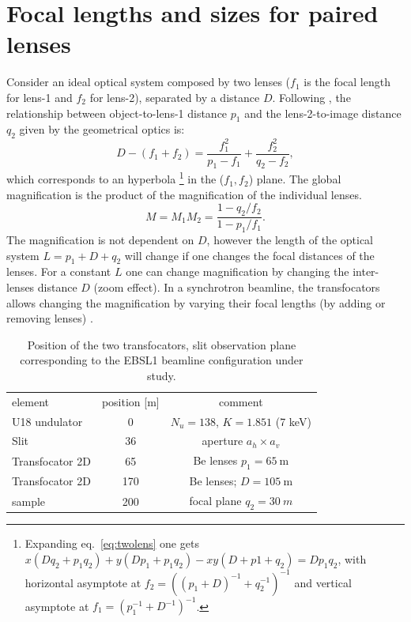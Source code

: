 \documentclass[9pt,twocolumn,twoside]{osajnl}
\begin{document}
\section{Focal lengths and sizes for paired lenses}

Consider an ideal optical system composed by two lenses ($f_1$ is the focal length for lens-1 and $f_2$ for lens-2), separated by a distance $D$. Following \cite{Goodman85}, the relationship between object-to-lens-1 distance $p_1$ and the lens-2-to-image distance $q_2$ given by the geometrical optics is:
\begin{equation}
\label{eq:twolens}
    D-(f_1+f_2)=\frac{f_1^2}{p_1-f_1} + \frac{f_2^2}{q_2-f_2},
\end{equation}
which corresponds to an hyperbola
\footnote{Expanding eq.~\ref{eq:twolens} one gets $x(D q_2 + p_1 q_2) + y (D p_1 + p_1 q_2) - x y (D + p1 + q_2) = D p_1 q_2$,  with horizontal asymptote at $f_{2}=((p_1+D)^{-1}+q_2^{-1})^{-1}$ and vertical asymptote at $f_{1}=(p_1^{-1}+D^{-1})^{-1}$.} in the ($f_1,f_2$) plane.
The global magnification is the product of the magnification of the individual lenses.
\begin{equation}
\label{eq:magnification}
    M=M_1 M_2=\frac{1-q_2/f_2}{1-p_1/f_1}.
\end{equation}
The magnification is not dependent on $D$, however the length of the optical system $L=p_1+D+q_2$ will change if one changes the focal distances of the lenses. For a constant $L$ one can change magnification by changing the inter-lenses distance $D$ (zoom effect). In a synchrotron beamline, the transfocators allows changing the magnification by varying their focal lengths (by adding or removing lenses) \cite{Vaughan:kv5084}.


\begin{table}[htbp]
    \caption{
    \label{table:id18parameters}
    Position of the two transfocators, slit observation plane corresponding to the EBSL1 beamline configuration under study. }
    \centering
    \begin{tabular}{l|c|c}
         element & position [m] & comment\\
         U18 undulator& 0 & $N_u=138$, $K=1.851$ (7 keV)\\
         Slit & 36 &
         aperture $a_h\times a_v$
         \\
         Transfocator 2D & 65 & Be lenses $p_1=\SI{65}{\meter}$
         \\ 
         Transfocator 2D & 170 & Be lenses;  $D=\SI{105}{\meter}$ \\
         sample & 200 & focal plane $q_2 = \SI{30}{m}$
    \end{tabular}
\end{table}
\end{document}
